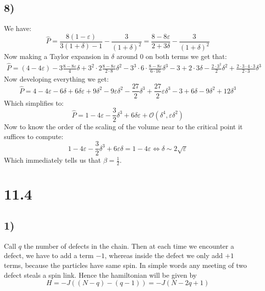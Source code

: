 \documentclass[10pt,a4paper]{book}
\begin{document}
\subsection*{8)}
We have:
\[
\hat{P} = \frac{8(1 - \varepsilon)}{3(1 + \delta) - 1} - \frac{3}{(1 + \delta)^2} = \frac{8 - 8 \varepsilon}{2 + 3 \delta} - \frac{3}{(1 + \delta)^2}
\]
Now making a Taylor expansion in $\delta$ around 0 on both terms we get that:
\begin{align*}
\hat{P} = (4 - 4 \varepsilon) - 3 \frac{8 - 8 \varepsilon}{4} \delta + 3^2 \cdot 2 \frac{8 - 8 \varepsilon}{2\cdot 8} \delta^2 - 3^3 \cdot 6 \cdot \frac{8 - 8 \varepsilon}{6 \cdot 16} \delta^3 - 3  + 2 \cdot 3 \delta - \frac{2 \cdot 3^2}{2} \delta^2 + \frac{2 \cdot 3 \cdot 4 \cdot 3}{2 \cdot 3} \delta^3
\end{align*}
Now developing everything we get:
\[
\hat{P} = 4 - 4\varepsilon - 6 \delta + 6 \delta \varepsilon + 9 \delta^2 - 9 \varepsilon \delta^2 - \frac{27}{2} \delta^3 + \frac{27}{2} \varepsilon \delta^3 - 3 + 6 \delta - 9 \delta^2 + 12\delta^3
\]
Which simplifies to:
\[
\hat{P} = 1 - 4 \varepsilon - \frac{3}{2} \delta^3 + 6 \delta \varepsilon + \mathcal{O}(\delta^4, \varepsilon \delta^2)
\]
Now to know the order of the scaling of the volume near to the critical point it suffices to compute:
\[
1 - 4 \varepsilon - \frac{3}{2} \delta^3 + 6 \varepsilon \delta = 1 - 4 \varepsilon \Leftrightarrow \delta \sim 2\sqrt{\varepsilon}
\]
Which immediately tells us that $\beta = \frac{1}{2}$.


\section*{11.4}
\subsection*{1)}
Call $q$ the number of defects in the chain. Then at each time we encounter a defect, we have to add a term $-1$, whereas inside the defect we only add $+1$ terms, because the particles have same spin. In simple words any meeting of two defect steals a spin link. Hence the hamiltonian will be given by 
$$H=-J((N-q)-(q-1))=-J(N-2q+1)$$
\end{document}
